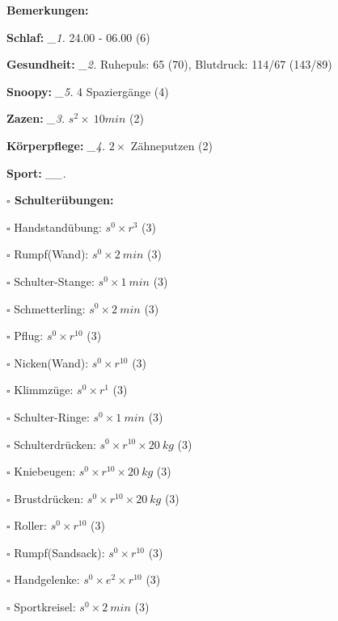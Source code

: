 \documentclass[10pt,a4paper]{article}
\newcommand\prop[1] {{\color {alizarin} {\bf #1}}}             %
\newcommand\mand[1] {{\color {burntorange} {\bf #1}}}          %
\newcommand\topspace{\vskip -15pt \hskip 20pt}
\newcommand\n[1] { {\sl #1.} \hskip 5pt }
\begin{document}
\begin{mdframed}[style=daystyle]
  \begin{labeling}{{\mand {Bemerkungen:}}}
    \setlength\itemsep{-3pt}
  \item[{\mand {Schlaf:}}]        \n{\_1} 24.00 - 06.00 (6)
  \item[{\mand {Gesundheit:}}]    \n{\_2} Ruhepuls: 65 (70), Blutdruck: 114/67 (143/89)
  \item[{\mand {Snoopy:}}]        \n{\_5} 4 Spaziergänge (4)
  \item[{\mand {Zazen:}}]         \n{\_3} $s^2 \times\ 10 min$ (2)
  \item[{\mand {Körperpflege:}}]  \n{\_4} $2 \times$ Zähneputzen (2)
  \item[{\mand {Sport:}}]        \n{\_\_}
    \topspace
    \begin{minipage}{0.75\textwidth}  
      \begin{labeling}{\prop {$\square$ {Schulterübungen:}}} 
        \setlength\itemsep{-3pt}
      \item[$\square$ Handstandübung:]  $s^0 \times r^{3}$ (3)
      \item[$\square$ Rumpf(Wand):]     $s^0 \times 2\ min$ (3)
      \item[$\square$ Schulter-Stange:] $s^0 \times 1\ min$ (3)
      \item[$\square$ Schmetterling:]   $s^0 \times 2\ min$ (3)
      \item[$\square$ Pflug:]           $s^0 \times r^{10}$ (3)
      \item[$\square$ Nicken(Wand):]    $s^0 \times r^{10}$ (3)
      \item[$\square$ Klimmzüge:]       $s^0 \times r^1$ (3)
      \item[$\square$ Schulter-Ringe:]  $s^0 \times 1\ min$ (3)
      \item[$\square$ Schulterdrücken:] $s^0 \times r^{10} \times 20\ kg$ (3)
      \item[$\square$ Kniebeugen:]      $s^0 \times r^{10} \times 20\ kg$ (3)
      \item[$\square$ Brustdrücken:]    $s^0 \times r^{10} \times 20\ kg$ (3)
      \item[$\square$ Roller:]          $s^0 \times r^{10}$ (3)
      \item[$\square$ Rumpf(Sandsack):] $s^0 \times r^{10}$ (3)
      \item[$\square$ Handgelenke:]     $s^0 \times e^2 \times r^{10}$ (3)
      \item[$\square$ Sportkreisel:]    $s^0 \times 2\ min$ (3)

\end{labeling}
\end{minipage}
\end{labeling}
\end{mdframed}
\end{document}
